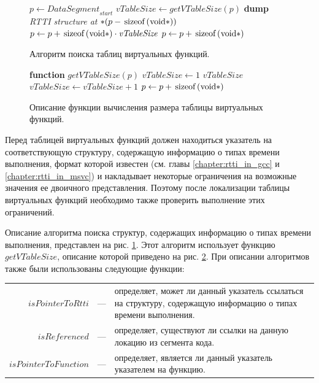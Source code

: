 \begin{figure}[htb!]
\begin{algorithmic}[1]
\STATE $p \gets \textit{DataSegment}_{\textit{start}}$
    \STATE $\textit{vTableSize} \gets \textit{getVTableSize}(p)$
            \STATE \textbf{dump} \textit{RTTI structure at} $\text{\lstinline{*}}(p - \text{\lstinline{sizeof(void*)}})$
        \ENDIF
        \STATE $p \gets p + \text{\lstinline{sizeof(void*)}} \cdot \textit{vTableSize}$
    \ELSE
        \STATE $p \gets p + \text{\lstinline{sizeof(void*)}}$
    \ENDIF
\ENDWHILE
\end{algorithmic}
\caption{Алгоритм поиска таблиц виртуальных функций.}
\label{alg:find_vtables}
\end{figure}

\begin{figure}[htb!]
\begin{algorithmic}[1]
\STATE \textbf{function} $\textit{getVTableSize}(p)$
\ELSE
    \STATE $\textit{vTableSize} \gets 1$
    \LOOP
            \RETURN $\textit{vTableSize}$
        \ENDIF
        \STATE $\textit{vTableSize} \gets \textit{vTableSize} + 1$
        \STATE $p \gets p + \text{\lstinline{sizeof(void*)}}$
    \ENDLOOP
\ENDIF
\end{algorithmic}
\caption{Описание функции вычисления размера таблицы виртуальных функций.}
\label{alg:getvtablesize}
\end{figure}

Перед таблицей виртуальных функций должен находиться указатель на соответствующую структуру, содержащую информацию о типах времени выполнения, формат которой известен (см. главы \ref{chapter:rtti_in_gcc} и \ref{chapter:rtti_in_msvc}) и накладывает некоторые ограничения на возможные значения ее двоичного представления. Поэтому после локализации таблицы виртуальных функций необходимо также проверить выполнение этих ограничений.

Описание алгоритма поиска структур, содержащих информацию о типах времени выполнения, представлен на рис. \ref{alg:find_vtables}. Этот алгоритм использует функцию $\textit{getVTableSize}$, описание которой приведено на рис. \ref{alg:getvtablesize}. При описании алгоритмов также были использованы следующие функции:
{\centering
\begin{tabularx}{\textwidth}{rcX}
    $\textit{isPointerToRtti}$ & --- & определяет, может ли данный указатель ссылаться на структуру, содержащую информацию о типах времени выполнения. \\
       $\textit{isReferenced}$ & --- & определяет, существуют ли ссылки на данную локацию из сегмента кода. \\
$\textit{isPointerToFunction}$ & --- & определяет, является ли данный указатель указателем на функцию. \\
\end{tabularx}}

